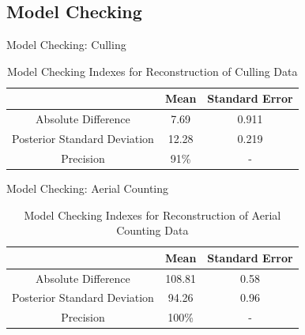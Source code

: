 \documentclass{beamer}
\begin{document}
\subsection{Model Checking}
\begin{frame}{Model Checking: Culling}
	\begin{table}[htbp] %
		\centering
		\caption{\label{tab:check}Model Checking Indexes for Reconstruction of Culling Data}
		\begin{tabular}{ccc}
			\toprule
			&Mean&Standard Error\\
			\midrule
			Absolute Difference&7.69 & 0.911\\
			Posterior Standard Deviation & 12.28 & 0.219\\
			Precision & 91\% & -\\
			\bottomrule
		\end{tabular}
	\end{table}

\end{frame}

\begin{frame}{Model Checking: Aerial Counting}
	\begin{table}[htbp] %
		\centering
		\caption{\label{tab:check2}Model Checking Indexes for Reconstruction of Aerial Counting Data}
		\begin{tabular}{ccc}
			\toprule
			&Mean&Standard Error\\
			\midrule
			Absolute Difference&108.81 & 0.58\\
			Posterior Standard Deviation & 94.26 & 0.96\\
			Precision & 100\% & -\\
			\bottomrule
		\end{tabular}
	\end{table}
	
\end{frame}
\end{document}
